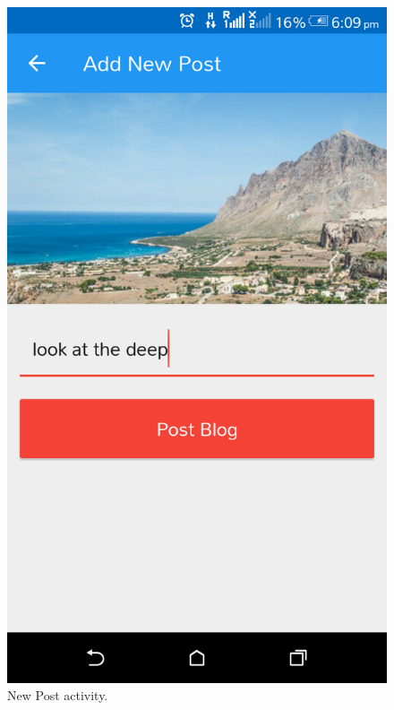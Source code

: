\begin{figure}[!ht]
	\centering
	\includegraphics[scale=0.2]{new-post.png}
	\caption{\label{img17} New Post activity.}
\end{figure}






